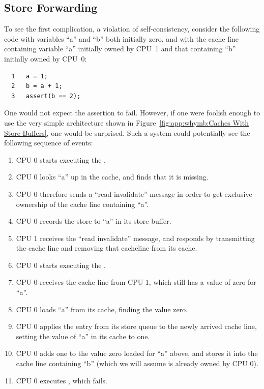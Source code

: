 \subsection{Store Forwarding}
\label{sec:app:whymb:Store Forwarding}

To see the first complication, a violation of self-consistency,
consider the following code with variables ``a'' and ``b'' both initially
zero, and with the cache line containing variable ``a'' initially
owned by CPU~1 and that containing ``b'' initially owned by CPU~0:

\vspace{5pt}
\begin{minipage}[t]{\columnwidth}
\small
\begin{verbatim}
  1   a = 1;
  2   b = a + 1;
  3   assert(b == 2);
\end{verbatim}
\end{minipage}
\vspace{5pt}

One would not expect the assertion to fail.
However, if one were foolish enough to use the very simple architecture
shown in
Figure~\ref{fig:app:whymb:Caches With Store Buffers},
one would be surprised.
Such a system could potentially see the following sequence of events:
\begin{enumerate}
\item	CPU 0 starts executing the .
\item	CPU 0 looks ``a'' up in the cache, and finds that it is missing.
\item	CPU 0 therefore sends a ``read invalidate'' message in order to
	get exclusive ownership of the cache line containing ``a''.
\item	CPU 0 records the store to ``a'' in its store buffer.
\item	CPU 1 receives the ``read invalidate'' message, and responds
	by transmitting the cache line and removing that cacheline from
	its cache.
\item	CPU 0 starts executing the .
\item	CPU 0 receives the cache line from CPU 1, which still has
	a value of zero for ``a''.
\item	CPU 0 loads ``a'' from its cache, finding the value zero.
	\label{item:app:whymb:Need Store Buffer}
\item	CPU 0 applies the entry from its store queue to the newly
	arrived cache line, setting the value of ``a'' in its cache
	to one.
\item	CPU 0 adds one to the value zero loaded for ``a'' above,
	and stores it into the cache line containing ``b''
	(which we will assume is already owned by CPU 0).
\item	CPU 0 executes , which fails.
\end{enumerate}

